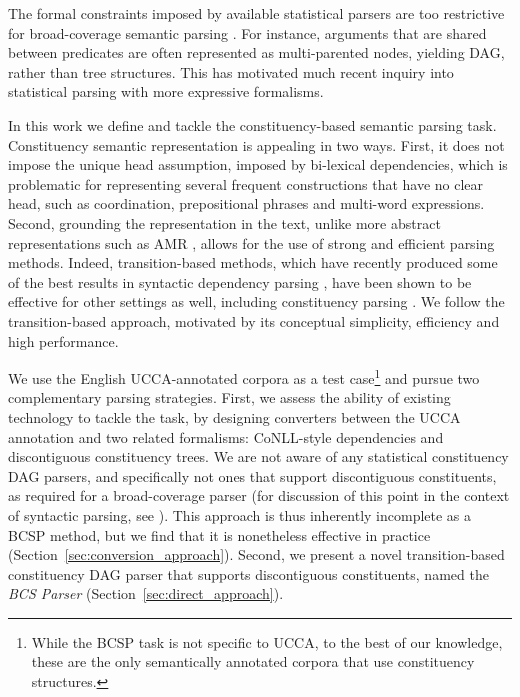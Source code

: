 \documentclass[11pt]{article}
\newcommand{\secref}[1]{Section~\ref{#1}}
\begin{document}

The formal constraints imposed by available statistical parsers are
too restrictive for broad-coverage semantic parsing \cite{oepen2015semeval}.
For instance, arguments that are
shared between predicates are often represented as multi-parented nodes,
yielding DAG, rather than tree structures. This has motivated much recent
inquiry into statistical parsing with more expressive formalisms.

In this work we define and tackle the constituency-based semantic parsing task.
Constituency semantic representation is appealing in two ways.
First, it does not impose the unique head assumption, imposed
by bi-lexical dependencies, which is problematic for representing several
frequent constructions that have no clear
head, such as coordination, prepositional phrases and multi-word expressions.
Second, grounding the representation in the text, unlike more abstract representations
such as AMR \cite{banarescu2013abstract},
allows for the use of strong and efficient parsing methods.
Indeed, transition-based methods, which have recently produced some of the best
results in syntactic dependency
parsing \cite{dyer2015transition,ballesteros2015improved},
have been shown to be effective for other settings as well,
including constituency parsing \cite{sagae2005classifier,zhu2013fast,maier2015discontinuous}. 
We follow the transition-based approach, motivated by
its conceptual simplicity, efficiency and high performance.

We use the English UCCA-annotated corpora \cite{abend2013universal} as a test
case\footnote{While the BCSP task is not specific to UCCA,
  to the best of our knowledge, these are the only
  semantically annotated corpora that use constituency structures.}
and pursue two complementary parsing strategies.
First, we assess the ability of existing technology to tackle the task,
by designing converters between the UCCA annotation and two related formalisms:
CoNLL-style dependencies and discontiguous constituency trees.
We are not aware of any statistical constituency DAG parsers, and specifically not
ones that support discontiguous constituents, as required for a broad-coverage
parser (for discussion of this point in the context of syntactic parsing, see
\cite{kallmeyer2013data,pitler2015linear}).
This approach is thus inherently incomplete as a BCSP method, but we find that it is
nonetheless effective in practice (\secref{sec:conversion_approach}).
Second, we present a novel transition-based
constituency DAG parser that supports discontiguous constituents, named
the {\it BCS Parser} (\secref{sec:direct_approach}).
\end{document}

